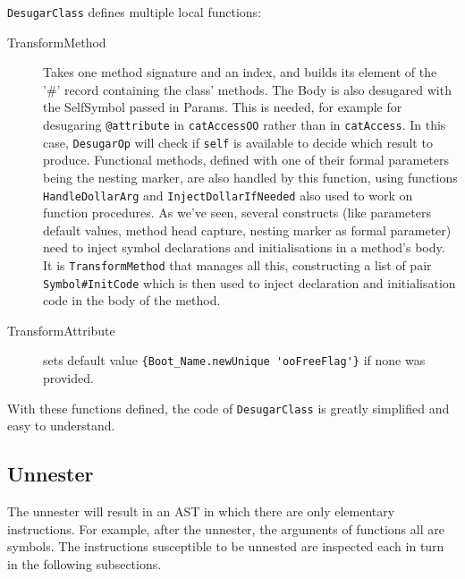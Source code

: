 \documentclass[a4paper]{memoir}
\begin{document}
\lstinline!DesugarClass! defines multiple local functions:
\begin{description}
  \item[TransformMethod] Takes one method signature and an index, and builds its
    element of the '\#' record containing the class' methods. The Body is also desugared with the SelfSymbol passed in Params.
    This is needed, for example for desugaring \lstinline!@attribute! in \lstinline!catAccessOO! rather than in
    \lstinline!catAccess!. In this case, \lstinline!DesugarOp! will check if
    \lstinline!self! is available to decide which result to produce.
    Functional methods, defined with one of their formal parameters being the
    nesting marker, are also handled by this function, using functions
    \lstinline!HandleDollarArg! and \lstinline!InjectDollarIfNeeded! also used
    to work on function procedures.
    As we've seen, several constructs (like parameters default values, method head capture, nesting marker
    as formal parameter) need to inject symbol declarations and initialisations
    in a method's body. It is \lstinline!TransformMethod! that manages all this,
    constructing a list of pair \lstinline!Symbol#InitCode! which is then used
    to inject declaration and initialisation code in the body of the method.
  \item[TransformAttribute] sets default value  
    \lstinline!{Boot_Name.newUnique 'ooFreeFlag'}! if none was provided.
\end{description}
With these functions defined, the code of \lstinline!DesugarClass! is greatly
simplified and easy to understand.

\subsection{Unnester}\label{sec:arch:unnester}
The unnester will result in an AST in which there are only elementary
instructions. For example, after the unnester, the arguments of functions all
are symbols. The instructions susceptible to be unnested are inspected each in turn in the following subsections.
\end{document}
